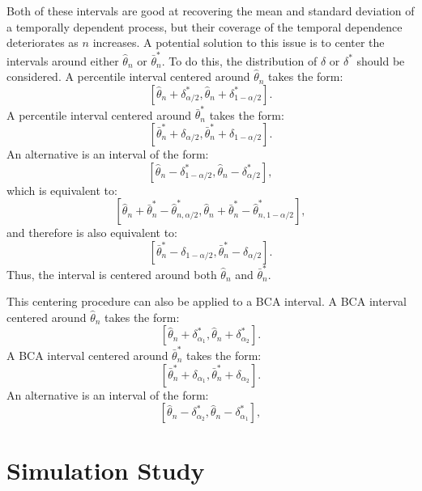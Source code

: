 \documentclass[12pt, letterpaper, titlepage]{article}
\begin{document}
	Both of these intervals are good at recovering the mean and standard deviation of a temporally dependent process, but their coverage of the temporal dependence deteriorates as $n$ increases. A potential solution to this issue is to center the intervals around either $\hat{\theta}_{n}$ or $\bar\theta_n^*$. To do this, the distribution of $\delta$ or $\delta^*$ should be considered. A percentile interval centered around $\hat{\theta}_{n}$ takes the form:
\[ [\hat{\theta}_{n} + \delta^*_{\alpha/2}, \hat{\theta}_{n} + \delta^*_{1 - \alpha/2}].\] 
A percentile interval centered around $\bar\theta_n^*$ takes the form: 
\[ [\bar\theta_n^* + \delta_{\alpha/2}, \bar\theta_n^* + \delta_{1 - \alpha/2}].\]
An alternative is an interval of the form:
\[ [\hat{\theta}_{n} - \delta^*_{1 - \alpha/2}, \hat{\theta}_{n} - \delta^*_{\alpha/2}],\] 
which is equivalent to:
\[ [\hat{\theta}_{n} + \bar\theta_n^*- \hat\theta_{n, \alpha/2}^*, \hat{\theta}_{n} + \bar\theta_n^* - \hat\theta_{n, 1 - \alpha/2}^*],\] 
and therefore is also equivalent to:
\[ [\bar\theta_n^* - \delta_{1 - \alpha/2}, \bar\theta_n^*- \delta_{\alpha/2}].\] 
Thus, the interval is centered around both $\hat{\theta}_{n}$ and $\bar\theta_n^*$.

This centering procedure can also be applied to a BCA interval. A BCA interval centered around $\hat{\theta}_{n}$ takes the form:
\[ [\hat{\theta}_{n} + \delta^*_{\alpha_1}, \hat{\theta}_{n} + \delta^*_{\alpha_2}].\] 
A BCA interval centered around $\bar\theta_n^*$ takes the form: 
\[ [\bar\theta_n^* + \delta_{\alpha_1}, \bar\theta_n^* + \delta_{\alpha_2}].\]
An alternative is an interval of the form:
\[ [\hat{\theta}_{n} - \delta^*_{\alpha_2}, \hat{\theta}_{n} - \delta^*_{\alpha_1}],\] 

\section{Simulation Study}
\label{sec:simstudy}

\end{document}
